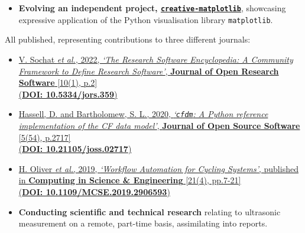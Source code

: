 \documentclass[10pt,a4paper]{cv_template}
\begin{document}
\begin{paracol}{2}
\divider

\begin{itemize}
  \item \textbf{Evolving an independent project, \href{https://github.com/sadielbartholomew/creative-matplotlib}{\texttt{creative-matplotlib}}}, showcasing expressive application of the Python visualisation library \texttt{matplotlib}.
\end{itemize}



All published, representing contributions to three different journals:

\begin{itemize}
  \item \href{https://openresearchsoftware.metajnl.com/article/10.5334/jors.359/}{V. Sochat \textit{et al.}, 2022, \textit{`The Research Software Encyclopedia: A Community Framework to Define Research Software'}, \textbf{Journal of Open Research Software} [10(1), p.2] \\({\color{Bright}\textbf{DOI: 10.5334/jors.359}})}
  \item \href{https://joss.theoj.org/papers/10.21105/joss.02717}{Hassell, D. and Bartholomew, S. L., 2020, \textit{`\texttt{cfdm}: A Python reference implementation of the CF data model'}, \textbf{Journal of Open Source Software} [5(54), p.2717] \\({\color{Bright}\textbf{DOI: 10.21105/joss.02717}})}
  \item \href{https://ieeexplore.ieee.org/document/8675433}{H. Oliver \textit{et al.}, 2019, \textit{`Workflow Automation for Cycling Systems'}, published in \textbf{Computing in Science \& Engineering} [21(4), pp.7-21] \\({\color{Bright}\textbf{DOI: 10.1109/MCSE.2019.2906593}})}
\end{itemize}



\begin{itemize}
  \item \textbf{Conducting scientific and technical research} relating to ultrasonic measurement on a remote, part-time basis, assimilating into reports.
\end{itemize}
\divider


\end{paracol}
\end{document}

